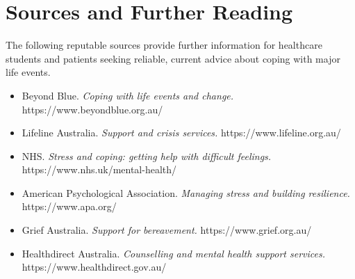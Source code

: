 \section*{Sources and Further Reading}
The following reputable sources provide further information for healthcare students and patients seeking reliable, current advice about coping with major life events.

\begin{itemize}
    \item Beyond Blue. \textit{Coping with life events and change.} https://www.beyondblue.org.au/
    \item Lifeline Australia. \textit{Support and crisis services.} https://www.lifeline.org.au/
    \item NHS. \textit{Stress and coping: getting help with difficult feelings.} https://www.nhs.uk/mental-health/
    \item American Psychological Association. \textit{Managing stress and building resilience.} https://www.apa.org/
    \item Grief Australia. \textit{Support for bereavement.} https://www.grief.org.au/
    \item Healthdirect Australia. \textit{Counselling and mental health support services.} https://www.healthdirect.gov.au/
\end{itemize}
